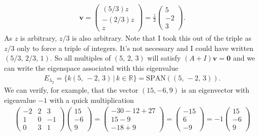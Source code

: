 {\begin{align*}
\mathbf{v} = \begin{pmatrix} (5/3)z \\ -(2/3)z \\ z \end{pmatrix}
= \frac{z}{3}\begin{pmatrix} 5 \\ -2 \\ 3 \end{pmatrix}.
\end{align*}
As $z$ is arbitrary, $z/3$ is also arbitrary. Note that I took this out of the triple as $z/3$ only to force a triple of integers. It's not necessary and I could have written $(5/3, \, 2/3, \, 1)$. So all multiples of $(5,\,2,\,3)$ will satisfy $(A+I)\mathbf{v}=\mathbf{0}$ and we can write the eigenspace associated with this eigenvalue
\begin{align*}
E_{\lambda_2} = \{ k(5,\,-2,\,3) \, | \, k \in \mathbb{R} \} = \text{SPAN} \left((5,\,-2,\,3)\right).
\end{align*}
We can verify, for example, that the vector $(15,-6,9)$ is an eigenvector with eigenvalue $-1$ with a quick multiplication
\begin{align*}
\begin{pmatrix}
 -2 &  2 &  3 \\
  1 &  0 & -1 \\
  0 &  3 &  1
\end{pmatrix}
\begin{pmatrix}
 15 \\ -6 \\ 9
\end{pmatrix}
=
\begin{pmatrix}
 -30 - 12 + 27 \\ 15 - 9 \\ -18 + 9
\end{pmatrix}
=
\begin{pmatrix}
 -15 \\ 6 \\ -9
\end{pmatrix}
=
-1
\begin{pmatrix}
 15 \\ -6 \\ 9
\end{pmatrix}
\end{align*}
}



